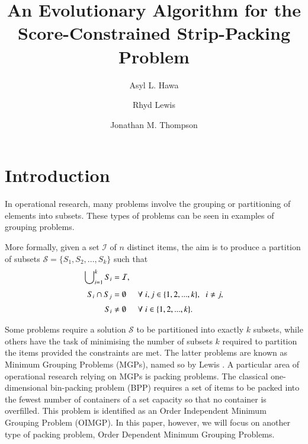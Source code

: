 \documentclass{elsarticle}
\begin{document}
	
\begin{frontmatter}
\title{An Evolutionary Algorithm for the Score-Constrained Strip-Packing Problem}
\author{Asyl L. Hawa}
\author{Rhyd Lewis}
\author{Jonathan M. Thompson}
\address{School of Mathematics, Cardiff University, Senghennydd Road, Cardiff, UK}
\end{frontmatter}


\section{Introduction}
\label{sec:intro}

In operational research, many problems involve the grouping or partitioning of elements into subsets. These types of problems can be seen in \alert{examples of grouping problems}.

More formally, given a set $\mathcal{I}$ of $n$ distinct items, the aim is to produce a partition of subsets $\mathcal{S} = \{S_1, S_2,...,S_k\}$ such that
\begin{subequations}
	\begin{align}
	\bigcup\nolimits_{i=1}^{k} S_i &= \mathcal{I}, \label{eqn:mgppackall}\\[3pt]
	S_i \cap S_j &= \emptyset \hspace{5mm} \forall \hspace{1mm} i, j \in \{1, 2, ...,k\}, \hspace{2mm} i \neq j, \label{eqn:mgpnooverlap} \\[3pt]
	S_i &\neq \emptyset \hspace{5mm} \forall \hspace{1mm} i\in \{1,2,...,k\}.\label{eqn:mgpallused}
	\end{align}
\end{subequations}

\noindent Some problems require a solution $\mathcal{S}$ to be partitioned into exactly $k$ subsets, while others have the task of minimising the number of subsets $k$ required to partition the items provided the constraints are met. The latter problems are known as Minimum Grouping Problems (MGPs), named so by Lewis \cite{lewis2009}. A particular area of operational research relying on MGPs is packing problems. The classical one-dimensional bin-packing problem (BPP) requires a set of items to be packed into the fewest number of containers of a set capacity so that no container is overfilled. This problem is identified as an Order Independent Minimum Grouping Problem (OIMGP). In this paper, however, we will focus on another type of packing problem, Order Dependent Minimum Grouping Problems.
\end{document}
